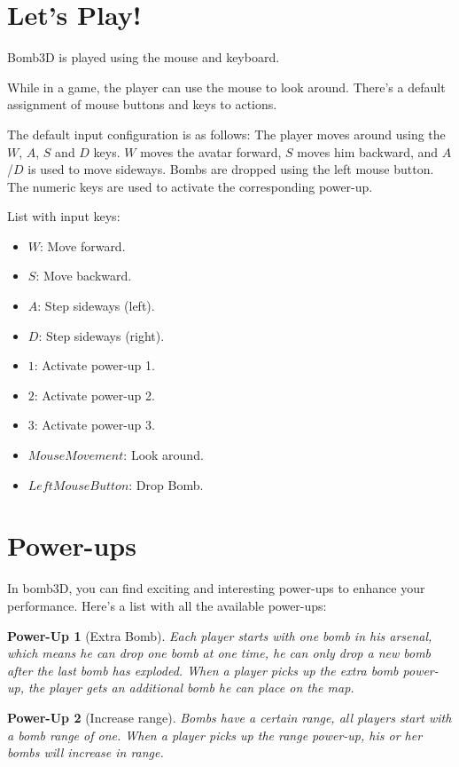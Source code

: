 \documentclass[a4paper,twoside,11pt]{book}
\theoremstyle{plain} \newtheorem{powerup}{Power-Up}
\begin{document}
    
    \section{Let's Play!}

    Bomb3D is played using the mouse and keyboard.

    While in a game, the player can use the mouse to look around. There's a default assignment of mouse buttons and keys to actions.

    The default input configuration is as follows: The player moves around using the $W$, $A$, $S$ and $D$ keys. $W$ moves the avatar forward, $S$ moves him backward, and $A$/$D$ is used to move sideways. Bombs are dropped using the left mouse button. The numeric keys are used to activate the corresponding power-up.

    List with input keys:
     \begin{itemize}
        \item $W$: Move forward.
        \item $S$: Move backward.
        \item $A$: Step sideways (left).
        \item $D$: Step sideways (right).
        \item $1$: Activate power-up 1.
        \item $2$: Activate power-up 2.
        \item $3$: Activate power-up 3.
        \item $Mouse Movement$: Look around.
        \item $Left Mouse Button$: Drop Bomb.
     \end{itemize}
    
    \section{Power-ups}

    In bomb3D, you can find exciting and interesting power-ups to enhance your performance. Here's a list with all the available power-ups:

\begin{powerup}[Extra Bomb]
       Each player starts with one bomb in his arsenal, which means he can drop one bomb at one time, he can only drop a new bomb after the last bomb has exploded. When a player picks up the extra bomb power-up, the player gets an additional bomb he can place on the map. 
\end{powerup}

\begin{powerup}[Increase range]
        Bombs have a certain range, all players start with a bomb range of one. When a player picks up the range power-up, his or her bombs will increase in range.
\end{powerup}
\end{document}
